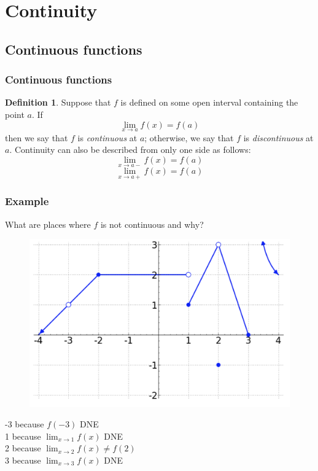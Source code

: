 \documentclass[t]{beamer}
\theoremstyle{plain}
\theoremstyle{definition}
\newtheorem{dfn}{Definition}
\newcommand{\limm}[1]{\displaystyle \lim_{x\to #1}}
\begin{document}
\section{Continuity}
\subsection{Continuous functions}
\begin{frame}
\frametitle{Continuous functions}
\begin{dfn} Suppose that $f$ is defined on some open interval containing the point $a$. If
\[\limm{a}f(x) = f(a) \]
then we say that $f$ is \textit{continuous} at $a$; otherwise, we say that $f$ is \textit{discontinuous} at $a$.  Continuity can also be described from only one side as follows:
\[\limm{a-}f(x) = f(a) \]
\[\limm{a+}f(x) = f(a) \]
\end{dfn}


\end{frame}

\begin{frame}
\frametitle{Example}

What are places where $f$ is not continuous and why?

	\begin{figure}[l]
	\includegraphics[scale=.3]{fig/con0}
	\label{fig}
	\end{figure}	
	
-3 because $f(-3)$ DNE\\
1 because $\limm{1}f(x)$ DNE\\
2 because $\limm{2}f(x) \neq f(2)$\\
3 because $\limm{3}f(x)$ DNE\\

\end{frame}
\end{document}
